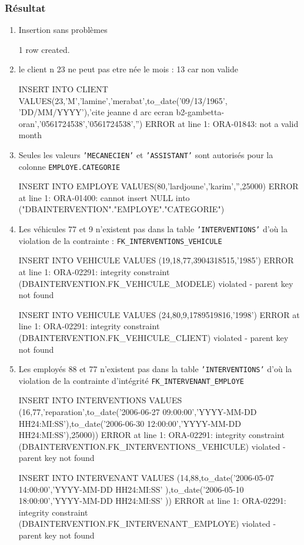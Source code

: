\documentclass[•]{article}
\begin{document}
\subsubsection{Résultat}
\begin{enumerate}
    \item Insertion sans problèmes
    \begin{sql}
    1 row created.
    \end{sql}
    
    \item le client n 23 ne peut pas etre née le mois : 13 car non valide
    \begin{sql}
    INSERT INTO CLIENT VALUES(23,'M','lamine','merabat',to_date('09/13/1965', 'DD/MM/YYYY'),'cite jeanne d arc ecran b2-gambetta-oran','0561724538','0561724538','')
    ERROR at line 1:
    ORA-01843: not a valid month
    \end{sql}
    \item Seules les valeurs \texttt{'MECANECIEN'} et \texttt{'ASSISTANT'} sont autorisés pour la colonne \texttt{EMPLOYE.CATEGORIE}
    \begin{sql}
    INSERT INTO EMPLOYE VALUES(80,'lardjoune','karim','',25000)
    ERROR at line 1:
    ORA-01400: cannot insert NULL into ("DBAINTERVENTION"."EMPLOYE"."CATEGORIE") 
    \end{sql}
    \item Les véhicules 77 et 9 n'existent pas dans la table \texttt{'INTERVENTIONS'} d'où la violation de la contrainte :      \texttt{FK\_INTERVENTIONS\_VEHICULE}
    \begin{sql}
    INSERT INTO VEHICULE VALUES (19,18,77,3904318515,'1985')
    ERROR at line 1:
    ORA-02291: integrity constraint (DBAINTERVENTION.FK_VEHICULE_MODELE) violated - parent key not found 
    
    INSERT INTO VEHICULE VALUES (24,80,9,1789519816,'1998')
    ERROR at line 1:
    ORA-02291: integrity constraint (DBAINTERVENTION.FK_VEHICULE_CLIENT) violated - parent key not found 
    \end{sql}
    \item Les employés 88 et 77 n'existent pas dans la table \texttt{'INTERVENTIONS'} d'où la violation de la contrainte d'intégrité \texttt{FK\_INTERVENANT\_EMPLOYE}
    \begin{sql}
    INSERT INTO INTERVENTIONS VALUES (16,77,'reparation',to_date('2006-06-27 09:00:00','YYYY-MM-DD HH24:MI:SS'),to_date('2006-06-30 12:00:00','YYYY-MM-DD HH24:MI:SS'),25000))
    ERROR at line 1:
    ORA-02291: integrity constraint (DBAINTERVENTION.FK_INTERVENTIONS_VEHICULE) violated - parent key not found 
    
    INSERT INTO INTERVENANT VALUES (14,88,to_date('2006-05-07 14:00:00','YYYY-MM-DD HH24:MI:SS' ),to_date('2006-05-10 18:00:00','YYYY-MM-DD HH24:MI:SS' ))
    ERROR at line 1:
    ORA-02291: integrity constraint (DBAINTERVENTION.FK_INTERVENANT_EMPLOYE) violated - parent key not found 
    \end{sql}
    \end{enumerate}
\end{document}
